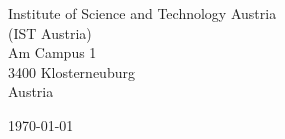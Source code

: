 \begin{minipage}{0.49\textwidth}
\begin{flushleft}
\noindent
Institute of Science and Technology Austria\\
(IST Austria)\\
Am Campus 1 \\
3400 Klosterneuburg\\
Austria\\
\end{flushleft}
\end{minipage}
\begin{minipage}{0.47\textwidth}
\begin{flushright}
\today
\end{flushright}
\end{minipage} \\

\newcommand{\univ}{Institute of Science and Technology Austria}
\newcommand{\univshort}{IST Austria}
\newcommand{\degree}{Ph.D.}
\newcommand{\dept}{Computer Science}



